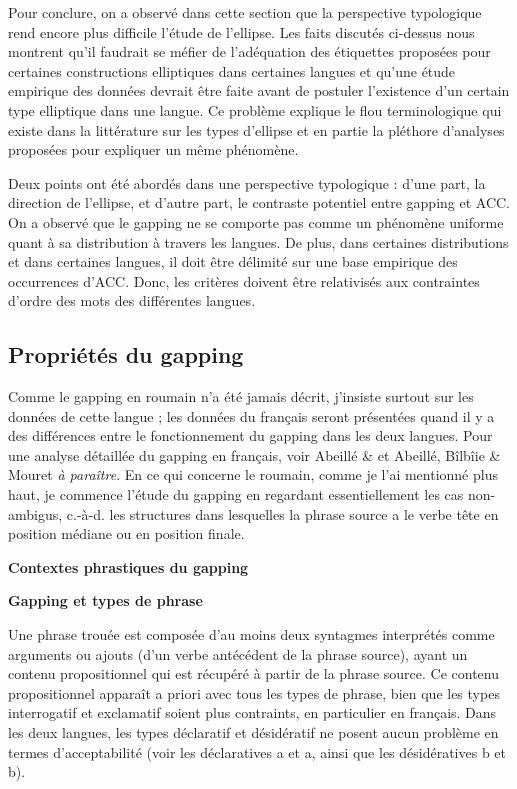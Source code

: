 Pour conclure, on a observé dans cette section que la perspective typologique rend encore plus difficile l'étude de l'ellipse. Les faits discutés ci-dessus nous montrent qu'il faudrait se méfier de l'adéquation des étiquettes proposées pour certaines constructions elliptiques dans certaines langues et qu'une étude empirique des données devrait être faite avant de postuler l'existence d'un certain type elliptique dans une langue. Ce problème explique le flou terminologique qui existe dans la littérature sur les types d'ellipse et en partie la pléthore d'analyses proposées pour expliquer un même phénomène. 

Deux points ont été abordés dans une perspective typologique : d'une part, la direction de l'ellipse, et d'autre part, le contraste potentiel entre gapping et ACC. On a observé que le gapping ne se comporte pas comme un phénomène uniforme quant à sa distribution à travers les langues. De plus, dans certaines distributions et dans certaines langues, il doit être délimité sur une base empirique des occurrences d'ACC. Donc, les critères doivent être relativisés aux contraintes d'ordre des mots des différentes langues.

\subsection{Propriétés du gapping}
\label{bkm:Ref300921908}Comme le gapping en roumain n'a été jamais décrit, j'insiste surtout sur les données de cette langue ; les données du français seront présentées quand il y a des différences entre le fonctionnement du gapping dans les deux langues. Pour une analyse détaillée du gapping en français, voir Abeillé \& \citet{Mouret2010} et Abeillé, Bîlbîie \& Mouret \textit{à paraître}. En ce qui concerne le roumain, comme je l'ai mentionné plus haut, je commence l'étude du gapping en regardant essentiellement les cas non-ambigus, c.-à-d. les structures dans lesquelles la phrase source a le verbe tête en position médiane ou en position finale.

{\bfseries
\label{bkm:Ref289613798}Contextes phrastiques du gapping}

{\bfseries
Gapping et types de phrase}

Une phrase trouée est composée d'au moins deux syntagmes interprétés comme arguments ou ajouts (d'un verbe antécédent de la phrase source), ayant un contenu propositionnel qui est récupéré à partir de la phrase source. Ce contenu propositionnel apparaît a priori avec tous les types de phrase, bien que les types interrogatif et exclamatif soient plus contraints, en particulier en français. Dans les deux langues, les types déclaratif et désidératif ne posent aucun problème en termes d'acceptabilité (voir les déclaratives a et a, ainsi que les désidératives b et b). 



